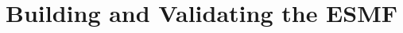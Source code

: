 
\setlength{\parskip}{1.5ex}
\setlength{\parindent}{0em}

\section{Building and Validating the ESMF}
\label{sec:TechOver}








